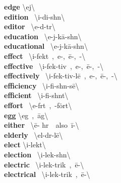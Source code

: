 \documentclass[10pt,a4paper]{article}
\begin{document}
\begin{multicols}{2}
\textbf{ edge }\quad \textbackslash \textprimstress ej\textbackslash \\
\textbf{ edition }\quad \ \textbackslash i-\textprimstress di-sh\textschwa n\textbackslash \\
\textbf{ editor }\quad \ \textbackslash \textprimstress e-d\textschwa -t\textschwa r\textbackslash \\
\textbf{ education }\quad \ \textbackslash \textsecstress e-j\textschwa -\textprimstress k\={a}-sh\textschwa n\textbackslash \\
\textbf{ educational }\quad \ \textbackslash \textsecstress e-j\textschwa -\textprimstress k\={a}-sh\textschwa n\textbackslash \\
\textbf{ effect }\quad \ \textbackslash i-\textprimstress fekt\ ,\ e-,\ \={e}-,\ \textschwa -\textbackslash \\
\textbf{ effective }\quad \ \textbackslash i-\textprimstress fek-tiv\ ,\ e-,\ \={e}-,\ \textschwa -\textbackslash \\
\textbf{ effectively }\quad \ \textbackslash i-\textprimstress fek-tiv-l\={e}\ ,\ e-,\ \={e}-,\ \textschwa -\textbackslash \\
\textbf{ efficiency }\quad \ \textbackslash i-\textprimstress fi-sh\textschwa n-s\={e}\textbackslash \\
\textbf{ efficient }\quad \ \textbackslash i-\textprimstress fi-sh\textschwa nt\textbackslash \\
\textbf{ effort }\quad \ \textbackslash \textprimstress e-f\textschwa rt\ ,\ -\textsecstress f\.{o}rt\textbackslash \\
\textbf{ egg }\quad \textbackslash \textprimstress eg\ ,\ \textprimstress \={a}g\textbackslash \\
\textbf{ either }\quad \ \textbackslash \textprimstress \={e}- h\textschwa r\ \ also\ \textprimstress \={i}-\textbackslash \\
\textbf{ elderly }\quad \ \textbackslash \textprimstress el-d\textschwa r-l\={e}\textbackslash \\
\textbf{ elect }\quad \textbackslash i-\textprimstress lekt\textbackslash \\
\textbf{ election }\quad \ \textbackslash i-\textprimstress lek-sh\textschwa n\textbackslash \\
\textbf{ electric }\quad \ \textbackslash i-\textprimstress lek-trik\ ,\ \={e}-\textbackslash \\
\textbf{ electrical }\quad \ \textbackslash i-\textprimstress lek-trik\ ,\ \={e}-\textbackslash \\

\end{multicols}
\end{document}

